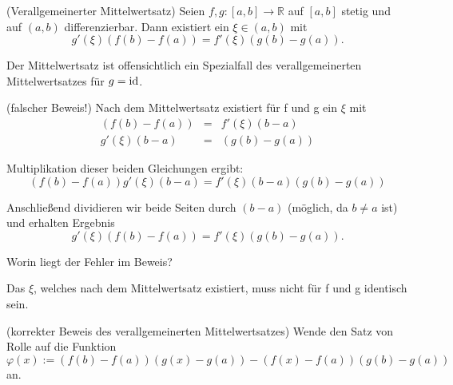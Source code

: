\documentclass[10pt]{scrbook}
\begin{document}
\begin{Sa} (Verallgemeinerter Mittelwertsatz)
Seien $f, g: [a, b] \rightarrow \mathbb{R}$ auf $[a, b]$ stetig und auf $(a, b)$ differenzierbar. Dann existiert ein $\xi\in (a, b)$ mit
\begin{equation}
g'\left(\xi\right) \left(f\left(b\right)-f\left(a\right)\right) = f'\left(\xi\right) \left(g\left(b\right)-g\left(a\right)\right).
\end{equation}
\end{Sa}

\begin{Bem}
Der Mittelwertsatz ist offensichtlich ein Spezialfall des verallgemeinerten Mittelwertsatzes für $g=\operatorname{id}$.
\end{Bem}

\begin{bew} (falscher Beweis!)
Nach dem Mittelwertsatz existiert für f und g ein $\xi$ mit
\begin{eqnarray*}
\left(f\left(b\right)-f\left(a\right)\right) & = & f'\left(\xi\right) \left(b-a\right) \\
g'\left(\xi\right) \left(b-a\right) & = & \left(g\left(b\right)-g\left(a\right)\right)
\end{eqnarray*}

Multiplikation dieser beiden Gleichungen ergibt:
\begin{equation}
\left(f\left(b\right)-f\left(a\right)\right) g'\left(\xi\right) \left(b-a\right) = f'\left(\xi\right) \left(b-a\right) \left(g\left(b\right)-g\left(a\right)\right)
\end{equation}

Anschließend dividieren wir beide Seiten durch $\left(b-a\right)$ (möglich, da $b\neq a$ ist) und erhalten  Ergebnis
\begin{equation}
g'\left(\xi\right) \left(f\left(b\right)-f\left(a\right)\right) = f'\left(\xi\right) \left(g\left(b\right)-g\left(a\right)\right).
\end{equation}
\end{bew}

\begin{Auf}
Worin liegt der Fehler im Beweis?
\end{Auf}

\begin{Loe}
Das $\xi$, welches nach dem Mittelwertsatz existiert, muss nicht für f und g identisch sein.
\end{Loe}

\begin{bew} (korrekter Beweis des verallgemeinerten Mittelwertsatzes)
Wende den Satz von Rolle auf die Funktion
\begin{displaymath}
\varphi(x) := \left(f\left(b\right)-f\left(a\right)\right) \left(g\left(x\right)-g\left(a\right)\right)-\left(f\left(x\right)-f\left(a\right)\right) \left(g\left(b\right)-g\left(a\right)\right)
\end{displaymath}
an.
\end{bew}
\end{document}
